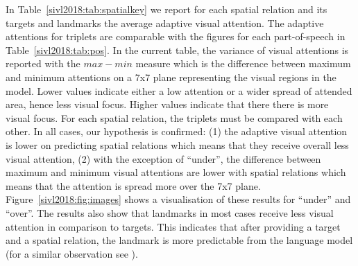 In Table~\ref{sivl2018:tab:spatialkey} we report for each spatial relation and its
targets and landmarks the average adaptive visual attention. The adaptive
attentions for triplets are comparable with the figures for each part-of-speech
in Table~\ref{sivl2018:tab:pos}. In the current table, the variance of visual attentions
is reported with the $max-min$ measure which is the difference between maximum
and minimum attentions on a 7x7 plane representing the visual regions in the
model. Lower values indicate either a low attention or a wider spread of attended area, hence less visual
focus. Higher values indicate that there there is more visual focus. For each
spatial relation, the triplets must be compared with each other. In all cases,
our hypothesis is confirmed: (1) the adaptive visual attention is lower on
predicting spatial relations which means that they receive overall less visual
attention, (2) with the exception of ``under'', the difference between maximum
and minimum visual attentions are lower with spatial relations which means that
the attention is spread more over the 7x7 plane. Figure~\ref{sivl2018:fig:images}
shows a visualisation of these results for ``under'' and ``over''. The results
also show that landmarks in most cases receive less visual attention in
comparison to targets. This indicates that after providing a target and a
spatial relation, the landmark is more predictable from the language model (for
a similar observation see \cite{dobnik-etal-2018-exploring}).

